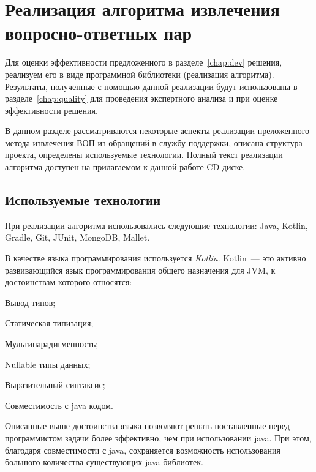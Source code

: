 \chapter{Реализация алгоритма извлечения вопросно-ответных пар}
\label{chap:impl}

Для оценки эффективности предложенного в разделе~\ref{chap:dev} решения, реализуем его в виде программной библиотеки (реализация алгоритма). Результаты, полученные с помощью данной реализации будут использованы в разделе~\ref{chap:quality} для проведения экспертного анализа и при оценке эффективности решения.

В данном разделе рассматриваются некоторые аспекты реализации преложенного метода извлечения ВОП из обращений в службу поддержки, описана структура проекта, определены используемые технологии. Полный текст реализации алгоритма доступен на прилагаемом к данной работе CD-диске.

\section{Используемые технологии}
При реализации алгоритма использовались следующие технологии: Java, Kotlin, Gradle, Git, JUnit, MongoDB, Mallet.

В качестве языка программирования используется \textit{Kotlin}. Kotlin~--- это активно развивающийся язык программирования общего назначения для JVM, к достоинствам которого относятся:


\begin{itemize*}
\item Вывод типов;
\item Статическая типизация;
\item Мультипарадигменность;
\item Nullable типы данных;
\item Выразительный синтаксис;
\item Совместимость с java кодом.
\end{itemize*}

Описанные выше достоинства языка позволяют решать поставленные перед программистом задачи более эффективно, чем при использовании java. При этом, благодаря совместимости с java, сохраняется возможность использования большого количества существующих java-библиотек.

